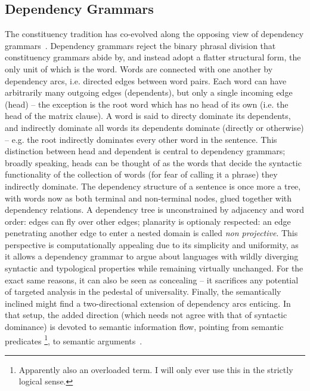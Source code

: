 \subsection{Dependency Grammars}
\label{subsection:dep_grammars}
The constituency tradition has co-evolved along the opposing view of dependency grammars~\cite[\textit{inter alia}]{tesniere2015elements,gaifman1965dependency,sgall1986meaning,mel1988dependency,sleator1995parsing}.
Dependency grammars reject the binary phrasal division that constituency grammars abide by, and instead adopt a flatter structural form, the only unit of which is the word.
Words are connected with one another by dependency arcs, i.e. directed edges between word pairs.
Each word can have arbitrarily many outgoing edges (dependents), but only a single incoming edge (head) -- the exception is the root word which has no head of its own (i.e. the head of the matrix clause).
A word is said to directy dominate its dependents, and indirectly dominate all words its dependents dominate (directly or otherwise) -- e.g. the root indirectly dominates every other word in the sentence.
This distinction between head and dependent is central to dependency grammars; broadly speaking, heads can be thought of as the words that decide the syntactic functionality of the collection of words (for fear of calling it a phrase) they indirectly dominate.
The dependency structure of a sentence is once more a tree, with words now as both terminal and non-terminal nodes, glued together with dependency relations.
A dependency tree is unconstrained by adjacency and word order: edges can fly over other edges; planarity is optionaly respected: an edge penetrating another edge to enter a nested domain is called \textit{non projective}.
This perspective is computationally appealing due to its simplicity and uniformity, as it allows a dependency grammar to argue about languages with wildly diverging syntactic and typological properties while remaining virtually unchanged.
For the exact same reasons, it can also be seen as concealing -- it sacrifices any potential of targeted analysis in the pedestal of universality.
Finally, the semantically inclined might find a two-directional extension of dependency arcs enticing.
In that setup, the added direction (which needs not agree with that of syntactic dominance) is devoted to semantic information flow, pointing from semantic predicates%
	\footnote{Apparently also an overloaded term. I will only ever use this in the strictly logical sense.},
to semantic arguments~\cite{mel2003levels}.

